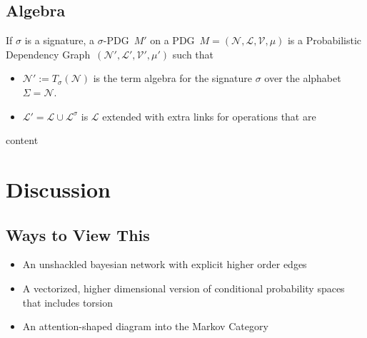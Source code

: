 \documentclass{article}
\newcommand{\modelname}{Probabilistic Dependency Graph}
\newcommand{\MN}{PDG}%
\begin{document}
\begin{vcat}
		\section{Algebra}\label{sec:algebra}
		\begin{defn}
			If $\sigma$ is a signature, a $\sigma$-\MN\ $M'$ on a \MN\ $M=(\mathcal N, \mathcal L, \mathcal V, \mu)$ is a \modelname\ $(\mathcal N', \mathcal L', \mathcal V', \mu')$ such that
			\begin{itemize}
				\item $\mathcal N':= T_\sigma(\mathcal N)$ is the term algebra for the signature $\sigma$ over the alphabet $\Sigma = \mathcal N$.
				\item $\mathcal L' = \mathcal L \cup \mathcal L^\sigma$ is $\mathcal L$ extended with extra links for operations that are 
			\end{itemize}
		\end{defn}
		
		\begin{example}
			content
		\end{example}		
	\end{vcat}

	\section{Discussion}
	
	
	\subsection{Ways to View This}
	\begin{itemize}
		\item An unshackled bayesian network with explicit higher order edges
		\item A vectorized, higher dimensional version of conditional probability spaces that includes torsion
		\item An attention-shaped diagram into the Markov Category
	\end{itemize}	
\end{document}
